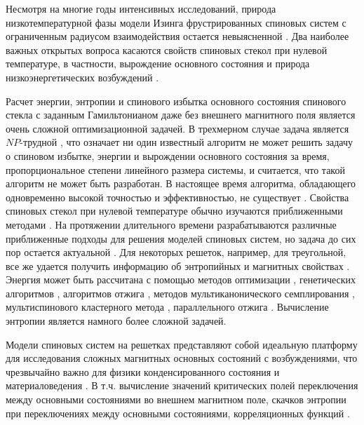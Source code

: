 \documentclass[utf8, babel, sor, jor, amsmath, amssymb, reprint]{elsarticle} %
\begin{document}
Несмотря на многие годы интенсивных исследований, природа низкотемпературной фазы модели Изинга фрустрированных спиновых систем с ограниченным радиусом взаимодействия остается невыясненной \cite{roma2010ground, newman2023proof}. Два наиболее важных открытых вопроса касаются свойств спиновых стекол при нулевой температуре, в частности, вырождение основного состояния и природа низкоэнергетических возбуждений \cite{newman2022ground}.  

Расчет энергии, энтропии и спинового избытка основного состояния спинового стекла с заданным Гамильтонианом даже без внешнего магнитного поля является очень сложной оптимизационной задачей. В трехмерном случае задача является $NP$-трудной \cite{barahona1982computational, hartmann2002optimization}, что означает ни один известный алгоритм не может решить задачу о спиновом избытке, энергии и вырождении основного состояния за время, пропорциональное степени линейного размера системы, и считается, что такой алгоритм не может быть разработан. В настоящее время алгоритма, обладающего одновременно высокой точностью и эффективностью, не существует \cite{fan2023searching}. Свойства спиновых стекол при нулевой температуре обычно изучаются приближенными методами \cite{roma2009ground, perez2012ground}. На протяжении длительного времени разрабатываются различные приближенные подходы для решения моделей спиновых систем, но задача до сих пор остается актуальной \cite{ rybin2022hybrid, makarova2023canonical,farias2024differentiable}.  Для некоторых решеток, например, для треугольной, все же удается получить информацию об энтропийных и магнитных свойствах \cite{jurvcivsinova2024classical}. Энергия может быть рассчитана с помощью методов оптимизации \cite{hartmann2002optimization, hartmann2004new}, генетических алгоритмов \cite{holland1992adaptation}, алгоритмов отжига \cite{kirkpatrick1983optimization}, методов мультиканонического семплирования \cite{berg1994ground, shevchenko2017multicanonical}, мультиспинового кластерного метода \cite{makarova2023canonical}, параллельного отжига \cite{PhysRevB.50.16444, roma2009ground}. Вычисление энтропии является намного более сложной задачей. 

Модели спиновых систем на решетках представляют собой идеальную платформу для исследования сложных магнитных основных состояний с возбуждениями, что чрезвычайно важно для физики конденсированного состояния и материаловедения \cite{lacroix2011introduction}. В т.ч. вычисление значений критических полей переключения между основными состояниями во внешнем магнитном поле, скачков энтропии при переключениях между основными состояниями, корреляционных функций \cite{ramirez2004effect, rosas2004random, andriushchenko2019large}. 
\end{document}
